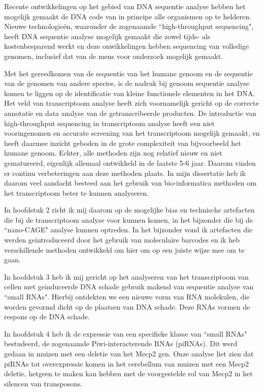 Recente ontwikkelingen op het gebied van DNA sequentie analyse hebben het mogelijk gemaakt de DNA code van in principe alle organismen op te helderen. Nieuwe technologieën, waaronder de zogenaamde ``high-throughput sequencing", heeft DNA sequentie analyse mogelijk gemaakt die zowel tijds- als kostenbesparend werkt en deze onwikkelingen hebben sequencing van volledige genomen, inclusief dat van de mens voor onderzoek mogelijk gemaakt.

Met het gereedkomen van de sequentie van het humane genoom en de sequentie van de genomen van andere species, is de nadruk bij genoom sequentie analyse komen te liggen op de identificatie van kleine functionele elementen in het DNA.  Het veld van transcriptoom analyse heeft zich voornamelijk gericht op de correcte annotatie en data analyse van de getranscribeerde producten. De introductie van high-throughput sequencing in transcriptoom analyse heeft een niet vooringenomen en accurate screening van het transcriptoom mogelijk gemaakt, en heeft daarmee inzicht geboden in de grote complexiteit van bijvoorbeeld het humane genoom. Echter, alle methoden zijn nog relatief nieuw en niet gematureerd, eigenlijk allemaal ontwikkeld in de laatste 5-6 jaar. Daarom vinden er continu verbeteringen aan deze methoden plaats. In mijn dissertatie heb ik daarom veel aandacht besteed aan het gebruik van bio-informatica methoden om het transcriptoom beter te kunnen analyseren.

In hoofdstuk 2 richt ik mij daarom op de mogelijke bias en technische artefacten  die bij de transcriptoom analyse voor kunnen komen, in het bijzonder die bij de ``nano-CAGE" analyse kunnen optreden. In het bijzonder vond ik artefacten die werden geintroduceerd door het gebruik van moleculaire barcodes en ik heb verschillende methoden ontwikkeld om hier om op een juiste wijze mee om te gaan.

In hoofdstuk 3 heb ik mij gericht op het analyseren van het transcriptoom van cellen met geinduceerde DNA schade gebruik makend van sequentie analyse van ``small RNAs". Hierbij ontdekten we een nieuwe vorm van RNA molekulen, die worden gevormd dicht op de plaatsen van DNA schade. Deze RNAs vormen de respons op de DNA schade.

In hoofdstuk 4 heb ik de expressie van een specifieke klasse van ``small RNAs" bestudeerd, de zogenaamde Piwi-interacterende RNAs (piRNAs). Dit werd gedaan in muizen met een deletie van het Mecp2 gen. Onze analyse liet zien dat piRNAs tot overexpressie komen in het cerebellum van muizen met een Mecp2 deletie, hetgeen te maken kan hebben met de voorgestelde rol van Mecp2 in het silencen van transposons.


